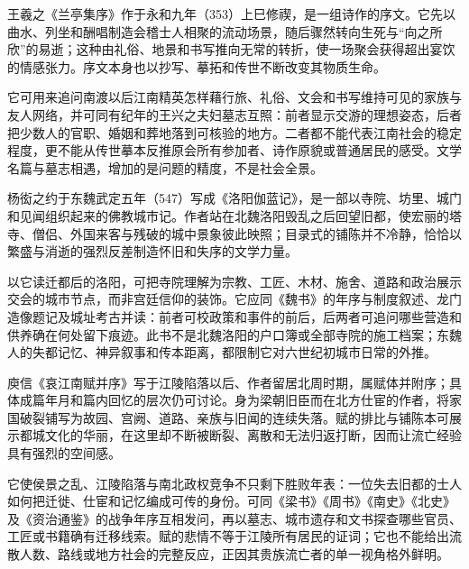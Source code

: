 \begin{sourcenote}
王羲之《兰亭集序》作于永和九年（353）上巳修禊，是一组诗作的序文。它先以曲水、列坐和酬唱制造会稽士人相聚的流动场景，随后骤然转向生死与“向之所欣”的易逝；这种由礼俗、地景和书写推向无常的转折，使一场聚会获得超出宴饮的情感张力。序文本身也以抄写、摹拓和传世不断改变其物质生命。

它可用来追问南渡以后江南精英怎样藉行旅、礼俗、文会和书写维持可见的家族与友人网络，并可同有纪年的王兴之夫妇墓志互照：前者显示交游的理想姿态，后者把少数人的官职、婚姻和葬地落到可核验的地方。二者都不能代表江南社会的稳定程度，更不能从传世摹本反推原会所有参加者、诗作原貌或普通居民的感受。文学名篇与墓志相遇，增加的是问题的精度，不是社会全景。
\end{sourcenote}

\begin{sourcenote}
杨衒之约于东魏武定五年（547）写成《洛阳伽蓝记》，是一部以寺院、坊里、城门和见闻组织起来的佛教城市记。作者站在北魏洛阳毁乱之后回望旧都，使宏丽的塔寺、僧侣、外国来客与残破的城中景象彼此映照；目录式的铺陈并不冷静，恰恰以繁盛与消逝的强烈反差制造怀旧和失序的文学力量。

以它读迁都后的洛阳，可把寺院理解为宗教、工匠、木材、施舍、道路和政治展示交会的城市节点，而非宫廷信仰的装饰。它应同《魏书》的年序与制度叙述、龙门造像题记及城址考古并读：前者可校政策和事件的前后，后两者可追问哪些营造和供养确在何处留下痕迹。此书不是北魏洛阳的户口簿或全部寺院的施工档案；东魏人的失都记忆、神异叙事和传本距离，都限制它对六世纪初城市日常的外推。
\end{sourcenote}

\begin{sourcenote}
庾信《哀江南赋并序》写于江陵陷落以后、作者留居北周时期，属赋体并附序；具体成篇年月和篇内回忆的层次仍可讨论。身为梁朝旧臣而在北方仕宦的作者，将家国破裂铺写为故园、宫阙、道路、亲族与旧闻的连续失落。赋的排比与铺陈本可展示都城文化的华丽，在这里却不断被断裂、离散和无法归返打断，因而让流亡经验具有强烈的空间感。

它使侯景之乱、江陵陷落与南北政权竞争不只剩下胜败年表：一位失去旧都的士人如何把迁徙、仕宦和记忆编成可传的身份。可同《梁书》《周书》《南史》《北史》及《资治通鉴》的战争年序互相发问，再以墓志、城市遗存和文书探查哪些官员、工匠或书籍确有迁移线索。赋的悲情不等于江陵所有居民的证词；它也不能给出流散人数、路线或地方社会的完整反应，正因其贵族流亡者的单一视角格外鲜明。
\end{sourcenote}

